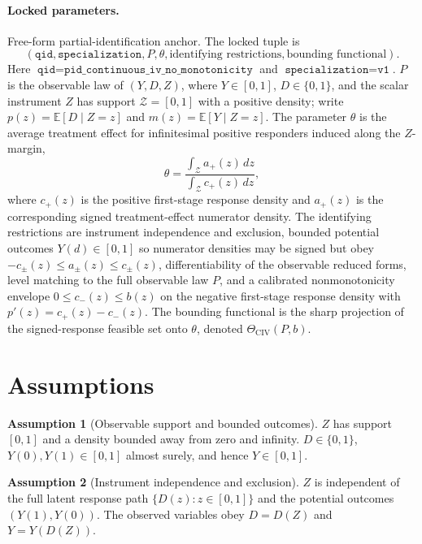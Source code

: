\documentclass[11pt]{article}
\newcommand{\E}{\mathbb{E}}
\theoremstyle{definition}
\newtheorem{assumption}{Assumption}
\theoremstyle{plain}
\theoremstyle{remark}
\begin{document}
\paragraph{Locked parameters.}
Free-form partial-identification anchor.  The locked tuple is
\[
(\texttt{qid},\texttt{specialization},P,\theta,\text{identifying restrictions},\text{bounding functional}).
\]
Here \(\texttt{qid}=\texttt{pid\_continuous\_iv\_no\_monotonicity}\) and \(\texttt{specialization}=\texttt{v1}\).  \(P\) is the observable law of \((Y,D,Z)\), where \(Y\in[0,1]\), \(D\in\{0,1\}\), and the scalar instrument \(Z\) has support \(\mathcal Z=[0,1]\) with a positive density; write \(p(z)=\E[D\mid Z=z]\) and \(m(z)=\E[Y\mid Z=z]\).  The parameter \(\theta\) is the average treatment effect for infinitesimal positive responders induced along the \(Z\)-margin,
\[
\theta=\frac{\int_{\mathcal Z} a_+(z)\,dz}{\int_{\mathcal Z} c_+(z)\,dz},
\]
where \(c_+(z)\) is the positive first-stage response density and \(a_+(z)\) is the corresponding signed treatment-effect numerator density.  The identifying restrictions are instrument independence and exclusion, bounded potential outcomes \(Y(d)\in[0,1]\) so numerator densities may be signed but obey \(-c_\pm(z)\le a_\pm(z)\le c_\pm(z)\), differentiability of the observable reduced forms, level matching to the full observable law \(P\), and a calibrated nonmonotonicity envelope \(0\le c_-(z)\le b(z)\) on the negative first-stage response density with \(p'(z)=c_+(z)-c_-(z)\).  The bounding functional is the sharp projection of the signed-response feasible set onto \(\theta\), denoted \(\Theta_{\mathrm{CIV}}(P,b)\).

\section{Assumptions}\label{sec-assumptions}
\begin{assumption}[Observable support and bounded outcomes]\label{ass:continuous-iv}
\(Z\) has support \([0,1]\) and a density bounded away from zero and infinity.
\(D\in\{0,1\}\), \(Y(0),Y(1)\in[0,1]\) almost surely, and hence
\(Y\in[0,1]\).
\end{assumption}

\begin{assumption}[Instrument independence and exclusion]\label{ass:iv-valid}
\(Z\) is independent of the full latent response path
\(\{D(z):z\in[0,1]\}\) and the potential outcomes \((Y(1),Y(0))\).
The observed variables obey \(D=D(Z)\) and \(Y=Y(D(Z))\).
\end{assumption}
\end{document}
